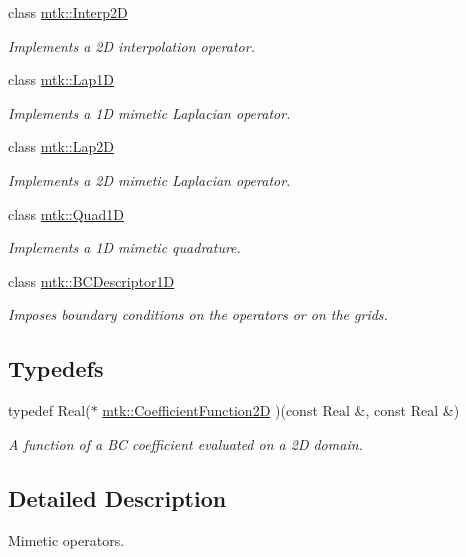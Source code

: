 \begin{DoxyCompactItemize}
class \hyperlink{classmtk_1_1Interp2D}{mtk\+::\+Interp2\+D}
\begin{DoxyCompactList}\small\item\em Implements a 2\+D interpolation operator. \end{DoxyCompactList}\item 
class \hyperlink{classmtk_1_1Lap1D}{mtk\+::\+Lap1\+D}
\begin{DoxyCompactList}\small\item\em Implements a 1\+D mimetic Laplacian operator. \end{DoxyCompactList}\item 
class \hyperlink{classmtk_1_1Lap2D}{mtk\+::\+Lap2\+D}
\begin{DoxyCompactList}\small\item\em Implements a 2\+D mimetic Laplacian operator. \end{DoxyCompactList}\item 
class \hyperlink{classmtk_1_1Quad1D}{mtk\+::\+Quad1\+D}
\begin{DoxyCompactList}\small\item\em Implements a 1\+D mimetic quadrature. \end{DoxyCompactList}\item 
class \hyperlink{classmtk_1_1BCDescriptor1D}{mtk\+::\+B\+C\+Descriptor1\+D}
\begin{DoxyCompactList}\small\item\em Imposes boundary conditions on the operators or on the grids. \end{DoxyCompactList}\end{DoxyCompactItemize}
\subsection*{Typedefs}
\begin{DoxyCompactItemize}
\item 
typedef Real($\ast$ \hyperlink{group__c07-mim__ops_gad9e1c0ace886b0029aefffa5f320e852}{mtk\+::\+Coefficient\+Function2\+D} )(const Real \&, const Real \&)
\begin{DoxyCompactList}\small\item\em A function of a B\+C coefficient evaluated on a 2\+D domain. \end{DoxyCompactList}\end{DoxyCompactItemize}


\subsection{Detailed Description}
Mimetic operators. 


